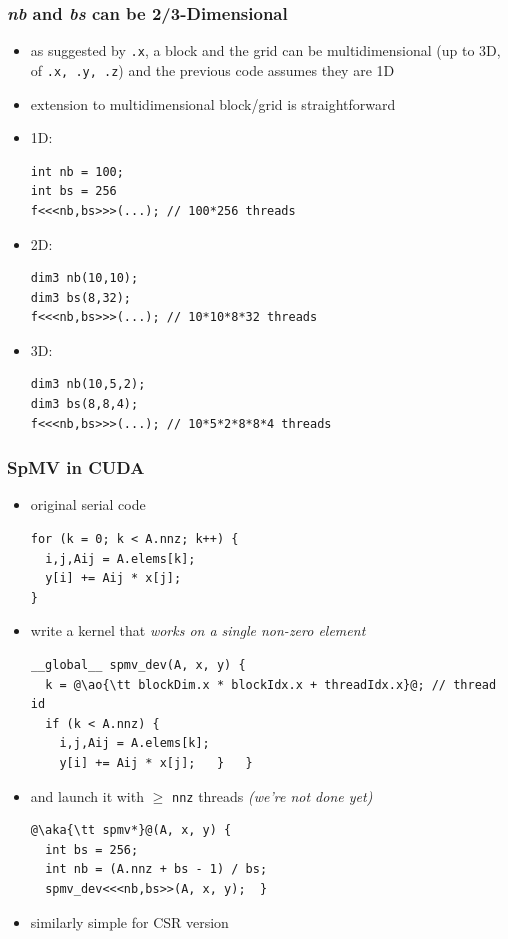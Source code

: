 \documentclass[12pt,dvipdfmx]{beamer}
\newcommand{\ao}[1]{{\color{blue}#1}}
\newcommand{\aka}[1]{{\color{red}#1}}
\begin{document}
\begin{frame}[fragile]
\frametitle{{\it nb} and {\it bs} can be 2/3-Dimensional}
\begin{itemize}
\item as suggested by {\tt .x}, a block and the grid
  can be multidimensional (up to 3D, of {\tt .x, .y, .z})
  and the previous code assumes they are 1D
  
\item extension to multidimensional block/grid is
  straightforward

\item 1D:
\begin{lstlisting}
int nb = 100;
int bs = 256
f<<<nb,bs>>>(...); // 100*256 threads
\end{lstlisting}

\item 2D:
\begin{lstlisting}
dim3 nb(10,10);
dim3 bs(8,32);
f<<<nb,bs>>>(...); // 10*10*8*32 threads
\end{lstlisting}

\item 3D:
\begin{lstlisting}
dim3 nb(10,5,2);
dim3 bs(8,8,4);
f<<<nb,bs>>>(...); // 10*5*2*8*8*4 threads
\end{lstlisting}
\end{itemize}
\end{frame}


\begin{frame}[fragile]
\frametitle{SpMV in CUDA}
\begin{itemize}
  \item original serial code
\begin{lstlisting}
for (k = 0; k < A.nnz; k++) {
  i,j,Aij = A.elems[k];
  y[i] += Aij * x[j];
}
\end{lstlisting}

\item write a kernel that
  \ao{\it works on a single non-zero element}
\begin{lstlisting}
__global__ spmv_dev(A, x, y) {
  k = @\ao{\tt blockDim.x * blockIdx.x + threadIdx.x}@; // thread id
  if (k < A.nnz) {
    i,j,Aij = A.elems[k];
    y[i] += Aij * x[j];   }   }
\end{lstlisting}

\item and launch it with $\geq$ {\tt nnz} threads
  \aka{\it (we're not done yet)}
\begin{lstlisting}
@\aka{\tt spmv*}@(A, x, y) {
  int bs = 256;
  int nb = (A.nnz + bs - 1) / bs;    
  spmv_dev<<<nb,bs>>(A, x, y);  }
\end{lstlisting}

\item similarly simple for CSR version

\end{itemize}
\end{frame}
\end{document}
